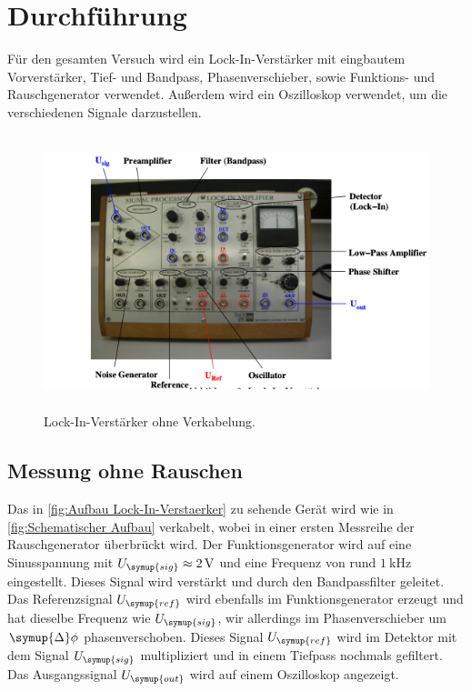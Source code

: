 \section{Durchführung}
\label{sec:Durchfuehrung}
Für den gesamten Versuch wird ein Lock-In-Verstärker mit eingbautem Vorverstärker, Tief- und Bandpass, Phasenverschieber,
sowie Funktions- und Rauschgenerator verwendet. Außerdem wird ein Oszilloskop verwendet, um die verschiedenen Signale darzustellen.

\begin{figure} [H]
    \centering
    \includegraphics[height=8cm]{content/Bilder/Aufbau_Bild.png}
    \caption{Lock-In-Verstärker ohne Verkabelung.\cite{v303}}
    \label{fig:Aufbau Lock-In-Verstaerker}
\end{figure}

\subsection{Messung ohne Rauschen}
\label{sec:Messung ohne Rauschen}
Das in \autoref{fig:Aufbau Lock-In-Verstaerker} zu sehende Gerät wird wie in \autoref{fig:Schematischer Aufbau} verkabelt, 
wobei in einer ersten Messreihe der Rauschgenerator überbrückt wird. Der Funktionsgenerator wird auf eine Sinusspannung mit 
$U_{\symup{sig}}\approx\qty{2}{\volt}$ und eine Frequenz von rund $\qty{1}{\kilo\hertz}$ eingestellt. Dieses Signal wird 
verstärkt und durch den Bandpassfilter geleitet. Das Referenzsignal $U_{\symup{ref}}$ wird ebenfalls im Funktionsgenerator 
erzeugt und hat dieselbe Frequenz wie $U_{\symup{sig}}$, wir allerdings im Phasenverschieber um $\symup{\Delta}\phi$ 
phasenverschoben. Dieses Signal $U_{\symup{ref}}$ wird im Detektor mit dem Signal $U_{\symup{sig}}$ multipliziert und in einem
Tiefpass nochmals gefiltert. Das Ausgangssignal $U_{\symup{out}}$ wird auf einem Oszilloskop angezeigt.

